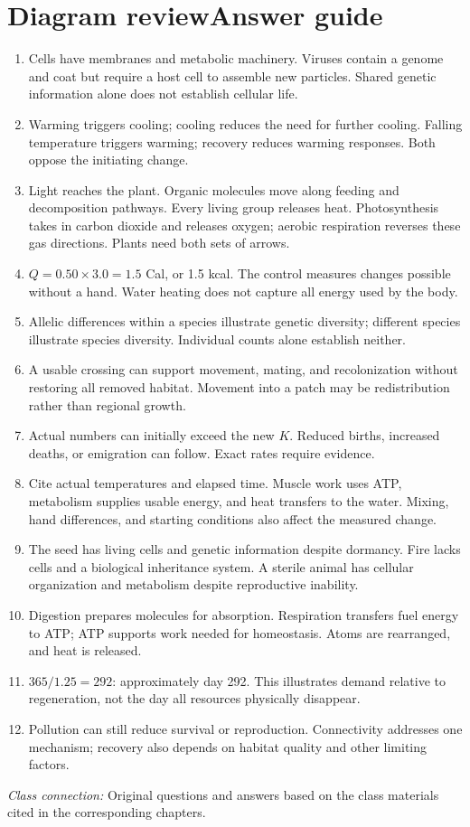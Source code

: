 \documentclass[11pt,letterpaper]{article}
\newcommand{\pagechapter}[2]{\clearpage\section*{#1}\phantomsection\label{#2}\addcontentsline{toc}{section}{#1}}
\newcommand{\classsource}[1]{{\footnotesize\textit{Class connection:} #1\par}}
\begin{document}
\pagechapter{Diagram review\quad Answer guide}{diagramanswers}
\begin{enumerate}[itemsep=5pt]
\item Cells have membranes and metabolic machinery. Viruses contain a genome and coat but require a host cell to assemble new particles. Shared genetic information alone does not establish cellular life.
\item Warming triggers cooling; cooling reduces the need for further cooling. Falling temperature triggers warming; recovery reduces warming responses. Both oppose the initiating change.
\item Light reaches the plant. Organic molecules move along feeding and decomposition pathways. Every living group releases heat. Photosynthesis takes in carbon dioxide and releases oxygen; aerobic respiration reverses these gas directions. Plants need both sets of arrows.
\item $Q=0.50\times3.0=1.5$ Cal, or 1.5 kcal. The control measures changes possible without a hand. Water heating does not capture all energy used by the body.
\item Allelic differences within a species illustrate genetic diversity; different species illustrate species diversity. Individual counts alone establish neither.
\item A usable crossing can support movement, mating, and recolonization without restoring all removed habitat. Movement into a patch may be redistribution rather than regional growth.
\item Actual numbers can initially exceed the new $K$. Reduced births, increased deaths, or emigration can follow. Exact rates require evidence.
\item Cite actual temperatures and elapsed time. Muscle work uses ATP, metabolism supplies usable energy, and heat transfers to the water. Mixing, hand differences, and starting conditions also affect the measured change.
\item The seed has living cells and genetic information despite dormancy. Fire lacks cells and a biological inheritance system. A sterile animal has cellular organization and metabolism despite reproductive inability.
\item Digestion prepares molecules for absorption. Respiration transfers fuel energy to ATP; ATP supports work needed for homeostasis. Atoms are rearranged, and heat is released.
\item $365/1.25=292$: approximately day 292. This illustrates demand relative to regeneration, not the day all resources physically disappear.
\item Pollution can still reduce survival or reproduction. Connectivity addresses one mechanism; recovery also depends on habitat quality and other limiting factors.
\end{enumerate}
\classsource{Original questions and answers based on the class materials cited in the corresponding chapters.}
\end{document}
